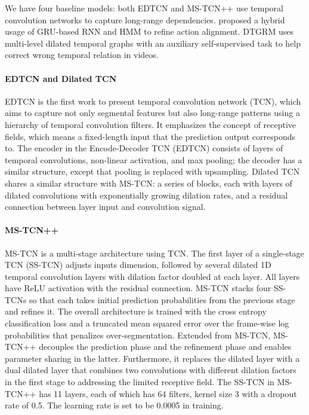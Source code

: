 We have four baseline models: both EDTCN \cite{8099596} and MS-TCN++ \cite{9186840} use temporal convolution networks to capture long-range dependencies.  proposed a hybrid usage of GRU-based RNN and HMM to refine action alignment. DTGRM \cite{wang2020temporal} uses multi-level dilated temporal graphs with an auxiliary self-supervised task to help correct wrong temporal relation in videos.

\paragraph{EDTCN and Dilated TCN}
EDTCN \cite{8099596} is the first work to present temporal convolution network (TCN), which aims to capture not only segmental features but also long-range patterns using a hierarchy of temporal convolution filters. It emphasizes the concept of receptive fields, which means a fixed-length input that the prediction output corresponds to. The encoder in the Encode-Decoder TCN (EDTCN) consists of layers of temporal convolutions, non-linear activation, and max pooling; the decoder has a similar structure, except that pooling is replaced with upsampling. Dilated TCN shares a similar structure with MS-TCN: a series of blocks, each with layers of dilated convolutions with exponentially growing dilation rates, and a residual connection between layer input and convolution signal.

\paragraph{MS-TCN++}
MS-TCN \cite{8953830} is a multi-stage architecture using TCN. The first layer of a single-stage TCN (SS-TCN) adjusts inputs dimension, followed by several dilated 1D temporal convolution layers with dilation factor doubled at each layer. All layers have ReLU activation with the residual connection. MS-TCN stacks four SS-TCNs so that each takes initial prediction probabilities from the previous stage and refines it. The overall architecture is trained with the cross entropy classification loss and a truncated mean squared error over the frame-wise log probabilities that penalizes over-segmentation. Extended from MS-TCN, MS-TCN++ \cite{9186840} decouples the prediction phase and the refinement phase and enables parameter sharing in the latter. Furthermore, it replaces the dilated layer with a dual dilated layer that combines two convolutions with different dilation factors in the first stage to addressing the limited receptive field. The SS-TCN in MS-TCN++ has 11 layers, each of which has 64 filters, kernel size 3 with a dropout rate of 0.5. The learning rate is set to be 0.0005 in training.


